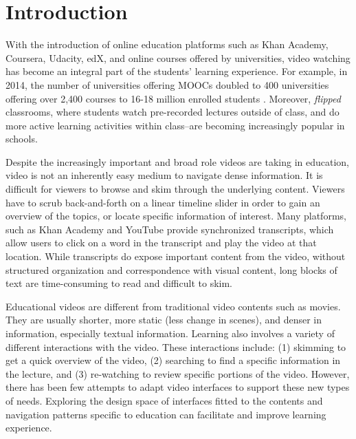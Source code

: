\section{Introduction}
With the introduction of online education platforms such as Khan Academy, Coursera, Udacity, edX, and online courses offered by universities, video watching has become an integral part of the students' learning experience. For example, in 2014, the number of universities offering MOOCs doubled to 400 universities offering over 2,400 courses to 16-18 million enrolled students \cite{edsurge2014}. Moreover, \textit{flipped} classrooms, where students watch pre-recorded lectures outside of class, and do more active learning activities within class--are becoming increasingly popular in schools.  

Despite the increasingly important and broad role videos are taking in education, video is not an inherently easy medium to navigate dense information. It is difficult for viewers to browse and skim through the underlying content. Viewers have to scrub back-and-forth on a linear timeline slider in order to gain an overview of the topics, or locate specific information of interest. Many platforms, such as Khan Academy and YouTube provide synchronized transcripts, which allow users to click on a word in the transcript and play the video at that location. While transcripts do expose important content from the video, without structured organization and correspondence with visual content, long blocks of text are time-consuming to read and difficult to skim. 

Educational videos are different from traditional video contents such as movies. They are usually shorter, more static (less change in scenes), and denser in information, especially textual information. Learning also involves a variety of different interactions with the video. These interactions include: (1) skimming to get a quick overview of the video, (2) searching to find a specific information in the lecture, and (3) re-watching to review specific portions of the video. However, there has been few attempts to adapt video interfaces to support these new types of needs. Exploring the design space of interfaces fitted to the contents and navigation patterns specific to education can facilitate and improve learning experience.

